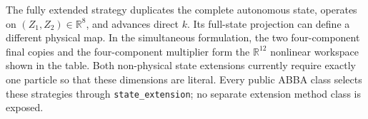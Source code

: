 \documentclass[11pt,a4paper]{article}
\newcommand{\R}{\mathbb{R}}
\begin{document}
The fully extended strategy duplicates the complete autonomous state, operates
on $(Z_1,Z_2)\in\R^8$, and advances direct $k$.  Its full-state projection can
define a different physical map.  In the simultaneous formulation, the two
four-component final copies and the four-component multiplier form the
$\R^{12}$ nonlinear workspace shown in the table.  Both non-physical state
extensions currently require exactly one particle so that these dimensions are
literal.  Every public ABBA class selects these strategies through
\texttt{state\_extension}; no separate extension method class is exposed.
\end{document}
